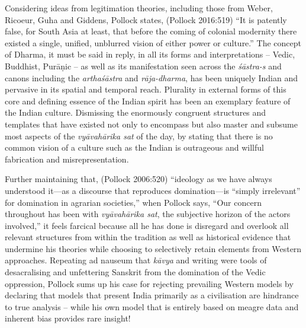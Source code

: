 Considering ideas from legitimation theories, including those from Weber, Ricoeur, Guha and Giddens, Pollock states, (Pollock 2016:519) “It is patently false, for South Asia at least, that before the coming of colonial modernity there existed a single, unified, unblurred vision of either power or culture.” The concept of Dharma, it must be said in reply, in all its forms and interpretations – Vedic, Buddhist, Purāṇic – as well as its manifestation seen across the \textit{śāstra-s} and canons including the \textit{arthaśāstra} and \textit{rāja-dharma}, has been uniquely Indian and pervasive in its spatial and temporal reach. Plurality in external forms of this core and defining essence of the Indian spirit has been an exemplary feature of the Indian culture. Dismissing the enormously congruent structures and templates that have existed not only to encompass but also master and subsume most aspects of the \textit{vyāvahārika sat} of the day, by stating that there is no common vision of a culture such as the Indian is outrageous and willful fabrication and misrepresentation.

Further maintaining that, (Pollock 2006:520) “ideology as we have always understood it—as a discourse that reproduces domination—is “simply irrelevant” for domination in agrarian societies,” when Pollock says, “Our concern throughout has been with \textit{vyāvahārika sat}, the subjective horizon of the actors involved,” it feels farcical because all he has done is disregard and overlook all relevant structures from within the tradition as well as historical evidence that undermine his theories while choosing to selectively retain elements from Western approaches. Repeating ad nauseum that \textit{kāvya} and writing were tools of desacralising and unfettering Sanskrit from the domination of the Vedic oppression, Pollock sums up his case for rejecting prevailing Western models by declaring that models that present India primarily as a civilisation are hindrance to true analysis – while his own model that is entirely based on meagre data and inherent bias provides rare insight!

